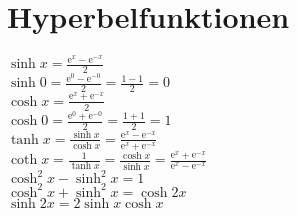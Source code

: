 \documentclass[a4paper, 10pt]{scrartcl}
\newcommand*\euler{\mathrm{e}}
\begin{document}
\section{Hyperbelfunktionen}
$\sinh{x} = \frac{\euler^{x} - \euler^{-x}}{2}$\\
$\sinh{0} = \frac{\euler^{0} - \euler^{-0}}{2} = \frac{1 - 1}{2} = 0$\\
$\cosh{x} = \frac{\euler^{x} + \euler^{-x}}{2}$\\
$\cosh{0} = \frac{\euler^{0} + \euler^{-0}}{2} = \frac{1 + 1}{2} = 1$\\
$\tanh{x} = \frac{\sinh{x}}{\cosh{x}} = \frac{\euler^{x} - \euler^{-x}}{\euler^{x} + \euler^{-x}}$\\
$\coth{x} = \frac{1}{\tanh{x}} = \frac{\cosh{x}}{\sinh{x}} = \frac{\euler^{x} + \euler^{-x}}{\euler^{x} - \euler^{-x}}$\\
$\cosh^{2}{x} - \sinh^{2}{x} = 1$\\
$\cosh^{2}{x} + \sinh^{2}{x} = \cosh{2x}$\\
$\sinh{2x} = 2\sinh{x}\cosh{x}$\\
\end{document}
